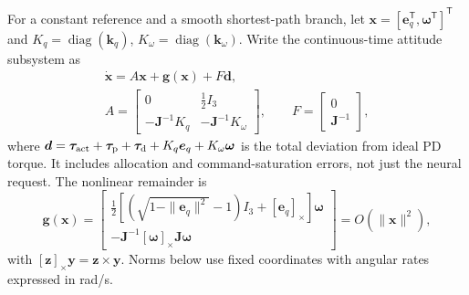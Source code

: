 \documentclass[letterpaper, 10 pt, conference]{ieeeconf}
\newcommand{\T}{^{\mathsf T}}
\begin{document}
For a constant reference and a smooth shortest-path branch, let
$\bm x=[\bm e_q\T,\bm\omega\T]\T$ and
$K_q=\operatorname{diag}(\bm k_q)$, $K_\omega=\operatorname{diag}(\bm k_\omega)$.
Write the continuous-time attitude subsystem as
\begin{equation}
 \begin{gathered}
 \dot{\bm x}=A\bm x+\bm g(\bm x)+F\bm d,\\
 A=\begin{bmatrix}0&\frac12I_3\\-\bm J^{-1}K_q&-\bm J^{-1}K_\omega\end{bmatrix},
 \qquad F=\begin{bmatrix}0\\\bm J^{-1}\end{bmatrix},
 \end{gathered}
 \label{eq:localmodel}
\end{equation}
where $\bm d=\bm\tau_{\rm act}+\bm\tau_{\rm p}+\bm\tau_{\rm d}
 +K_q\bm e_q+K_\omega\bm\omega$ is the total deviation from ideal PD torque.
It includes allocation and command-saturation errors, not just the neural
request. The nonlinear remainder is
\begin{equation}
 \bm g(\bm x)=\begin{bmatrix}
 \tfrac12[(\sqrt{1-\|\bm e_q\|^2}-1)I_3+[\bm e_q]_\times]\bm\omega\\
 -\bm J^{-1}[\bm\omega]_\times\bm J\bm\omega
 \end{bmatrix}=O(\|\bm x\|^2),
 \label{eq:localremainder}
\end{equation}
with $[\bm z]_\times\bm y=\bm z\times\bm y$. Norms below use fixed
coordinates with angular rates expressed in rad/s.
\end{document}
